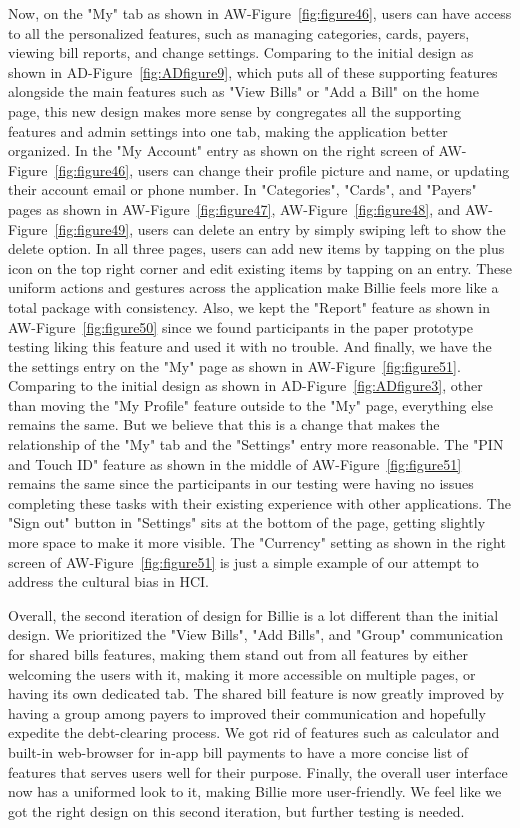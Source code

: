 \documentclass{sigchi}
\begin{document}
Now, on the "My" tab as shown in AW-Figure~\ref{fig:figure46}, users can have access to all the personalized features, such as managing categories, cards, payers, viewing bill reports, and change settings. Comparing to the initial design as shown in AD-Figure~\ref{fig:ADfigure9}, which puts all of these supporting features alongside the main features such as "View Bills" or "Add a Bill" on the home page, this new design makes more sense by congregates all the supporting features and admin settings into one tab, making the application better organized. In the "My Account" entry as shown on the right screen of AW-Figure~\ref{fig:figure46}, users can change their profile picture and name, or updating their account email or phone number. In "Categories", "Cards", and "Payers" pages as shown in AW-Figure~\ref{fig:figure47}, AW-Figure~\ref{fig:figure48}, and AW-Figure~\ref{fig:figure49}, users can delete an entry by simply swiping left to show the delete option. In all three pages, users can add new items by tapping on the plus icon on the top right corner and edit existing items by tapping on an entry. These uniform actions and gestures across the application make Billie feels more like a total package with consistency. Also, we kept the "Report" feature as shown in AW-Figure~\ref{fig:figure50} since we found participants in the paper prototype testing liking this feature and used it with no trouble. And finally, we have the the settings entry on the "My" page as shown in AW-Figure~\ref{fig:figure51}. Comparing to the initial design as shown in AD-Figure~\ref{fig:ADfigure3}, other than moving the "My Profile" feature outside to the "My" page, everything else remains the same. But we believe that this is a change that makes the relationship of the "My" tab and the "Settings" entry more reasonable. The "PIN and Touch ID" feature as shown in the middle of AW-Figure~\ref{fig:figure51} remains the same since the participants in our testing were having no issues completing these tasks with their existing experience with other applications. The "Sign out" button in "Settings" sits at the bottom of the page, getting slightly more space to make it more visible. The "Currency" setting as shown in the right screen of AW-Figure~\ref{fig:figure51} is just a simple example of our attempt to address the cultural bias in HCI.

Overall, the second iteration of design for Billie is a lot different than the initial design. We prioritized the "View Bills", "Add Bills", and "Group" communication for shared bills features, making them stand out from all features by either welcoming the users with it, making it more accessible on multiple pages, or having its own dedicated tab. The shared bill feature is now greatly improved by having a group among payers to improved their communication and hopefully expedite the debt-clearing process. We got rid of features such as calculator and built-in web-browser for in-app bill payments to have a more concise list of features that serves users well for their purpose. Finally, the overall user interface now has a uniformed look to it, making Billie more user-friendly. We feel like we got the right design on this second iteration, but further testing is needed.
\end{document}
